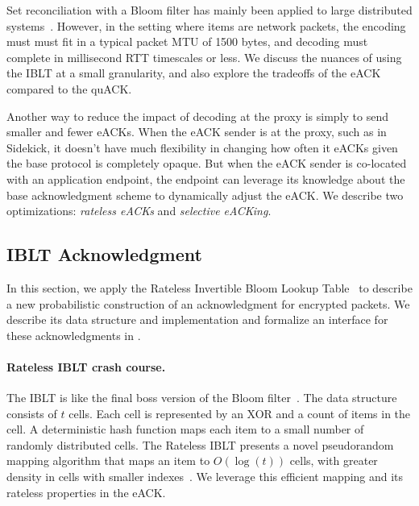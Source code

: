 
Set reconciliation with a Bloom filter has mainly been applied to large distributed systems~\cite
{yang2024practical,summermatter2021byzantine}. However, in the \Sys setting
where items are network packets, the encoding must must fit in a typical packet
MTU of 1500 bytes, and decoding must complete in millisecond RTT timescales or
less. We discuss the nuances of using the IBLT at a small granularity, and
also explore the tradeoffs of the eACK compared to the quACK.

Another way to reduce the impact of decoding at the proxy is simply to send smaller
and fewer eACKs. When the eACK sender is at the proxy, such as in Sidekick,
it doesn't have much flexibility in changing how often it eACKs given
the base protocol is completely opaque. But when the eACK sender is co-located
with an application endpoint, the endpoint can leverage its knowledge about the
base acknowledgment scheme to dynamically adjust the eACK.
We describe two optimizations: \textit{rateless eACKs} and \textit{selective eACKing}.




\subsection{IBLT Acknowledgment}
\label{sec:eack:iblt}

In this section, we apply
the Rateless Invertible Bloom Lookup Table~\cite{yang2024practical}
to describe a new probabilistic construction of an acknowledgment
for encrypted packets. We describe its data structure and implementation
and formalize an interface for these acknowledgments in .

\paragraph{Rateless IBLT crash course.} The IBLT is like the final boss version
 of the Bloom filter~\cite{goodrich2011invertible}. The data structure consists of $t$ cells. Each
 cell is represented by an XOR and a count of items in the cell. A
 deterministic hash function maps each item to a small number of randomly
 distributed cells. The Rateless IBLT presents a novel pseudorandom mapping
 algorithm that maps an item to $O(\log(t))$ cells, with greater density in
 cells with smaller indexes~\cite{yang2024practical}. We leverage this
 efficient mapping and its rateless properties in the eACK.

